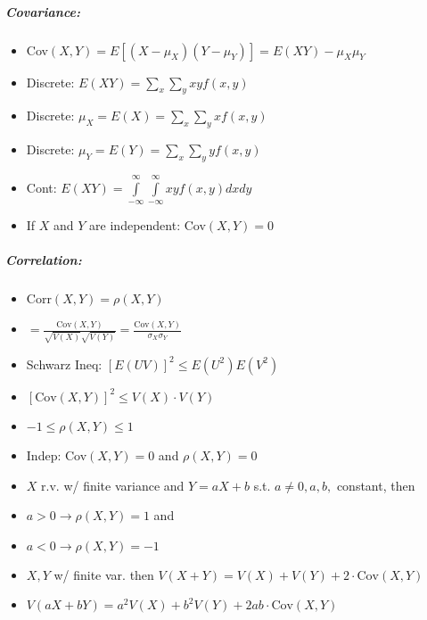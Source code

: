 \documentclass[landscape,10pt]{article}
\begin{document}
\begin{multicols}{4}
\subparagraph*{Covariance: }
\begin{itemize}
    \item[] Cov\((X,Y) = E[(X-\mu_X)(Y-\mu_Y)] = E(XY) - \mu_X\mu_Y\)
    \item[] Discrete: \(E(XY) = \sum\limits_x\sum\limits_yxyf(x,y)\)
    \item[] Discrete: \(\mu_X = E(X) = \sum\limits_x\sum\limits_yxf(x,y)\)
    \item[] Discrete: \(\mu_Y = E(Y) = \sum\limits_x\sum\limits_yyf(x,y)\)
    \item[] Cont: \(E(XY) = \int\limits_{-\infty}^{\infty}\int\limits_{-\infty}^{\infty}{xyf(x,y)dxdy}\)
    \item[] If \(X\) and \(Y\) are independent: Cov\((X,Y) = 0\)
\end{itemize}
\subparagraph*{Correlation: }
\begin{itemize}
    \item[] Corr\((X,Y) = \rho(X,Y)\)
    \item[] \(= \frac{\text{Cov}(X,Y)}{\sqrt{V(X)}\sqrt{V(Y)}} =\frac{\text{Cov}(X,Y)}{\sigma_X \sigma_Y}\)
    \item[] Schwarz Ineq: \([E(UV)]^2 \leq E(U^2)E(V^2)\)
    \item[] \([\text{Cov}(X,Y)]^2 \leq V(X) \cdot V(Y)\)
    \item[] \( -1 \leq \rho(X,Y) \leq 1\)
    \item[] Indep: Cov\((X,Y) = 0\) and \(\rho(X,Y) = 0\)
    \item[] \(X\) r.v. w/ finite variance and \(Y = aX+b\) s.t. \(a \neq 0, a,b,\) constant, then
    \item[] \(a > 0 \rightarrow \rho(X,Y) = 1\) and
    \item[] \(a < 0 \rightarrow \rho(X,Y) = -1\)
    \item[] \(X,Y\) w/ finite var. then \(V(X+Y) = V(X)+V(Y) + 2\cdot \text{Cov}(X,Y)\)
    \item[] \(V(aX + bY) = a^2 V(X) + b^2 V(Y) + 2ab\cdot\text{Cov}(X,Y)\)
\end{itemize}



\end{multicols}
\end{document}
